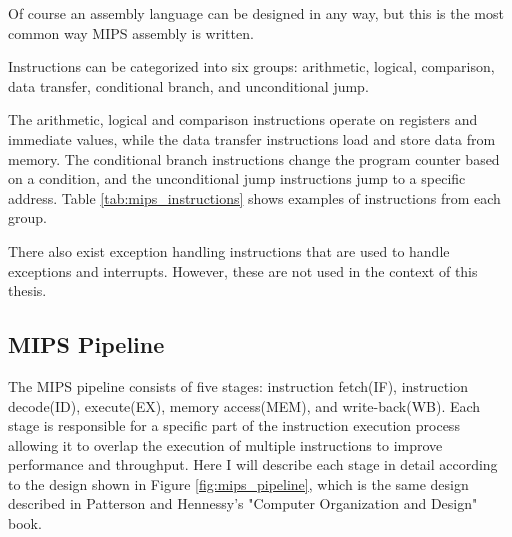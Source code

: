 Of course an assembly language can be designed in any way, but this is the most common way MIPS assembly is written.

Instructions can be categorized into six groups: arithmetic, logical, comparison, data transfer, conditional branch, and unconditional jump. 

The arithmetic, logical and comparison instructions operate on registers and immediate values, while the data transfer instructions load and store data from memory. The conditional branch instructions change the program counter based on a condition, and the unconditional jump instructions jump to a specific address. Table \ref{tab:mips_instructions} shows examples of instructions from each group.
\begin{table}[H]
    \centering
    \caption{Example MIPS Assembly Instructions for Each Group}
    \label{tab:mips_instructions}
\end{table}

There also exist exception handling instructions that are used to handle exceptions and interrupts. However, these are not used in the context of this thesis.

\subsection{MIPS Pipeline}\label{sec:mips_pipeline}
The MIPS pipeline consists of five stages: instruction fetch(IF), instruction decode(ID), execute(EX), memory access(MEM), and write-back(WB). Each stage is responsible for a specific part of the instruction execution process allowing it to overlap the execution of multiple instructions to improve performance and throughput. Here I will describe each stage in detail according to the design shown in Figure \ref{fig:mips_pipeline}, which is the same design described in Patterson and Hennessy's "Computer Organization and Design" book\cite{patterson1994computer}.

